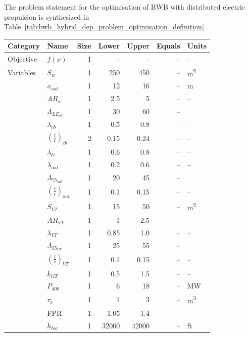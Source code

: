 The problem statement for the optimisation of BWB with distributed electric propulsion is synthesized in Table~\ref{tab:bwb_hybrid_dep_problem_optimisation_definition}. 
\begin{table}[h!]
	\centering
	\begin{tabular}{l l r r r r l}
		\hline
		\textbf{Category} & \textbf{Name} & \textbf{Size} & \textbf{Lower} & \textbf{Upper} & \textbf{Equals} & \textbf{Units} \\
		\hline
		Objective & $f\left(\underline{x}\right)$ & 1 & -- & -- & -- & -- \\
		\hline
		Variables & $S_w$ & 1 & \num{250} & \num{450} & -- & \si{\square\meter} \\
		& $x_{out}$ & 1 & \num{12} & \num{16} & -- & \si{\meter} \\
		& $AR_{w}$ & 1 & \num{2.5} & \num{5} & -- & -- \\
		& $\Lambda_{LE_{cb}}$ & 1 & \num{30} & \num{60} & -- & \si{\deg} \\
		& $\lambda_{cb}$ & 1 & \num{0.5} & \num{0.8} & -- & -- \\
		& $\left(\frac{t}{c}\right)_{cb}$ & 2 & \num{0.15} & \num{0.24} & -- & -- \\
		& $\lambda_{tr}$ & 1 & 0.6 & 0.8 & -- & -- \\
		& $\lambda_{out}$ & 1 & \num{0.2} & \num{0.6} & -- & -- \\
		& $\Lambda_{25_{out}}$ & 1 & \num{20} & \num{45} & -- & \si{\deg} \\
		& $\left(\frac{t}{c}\right)_{out}$ & 1 & \num{0.1} & \num{0.15} & -- & -- \\
		& $S_{VT}$ & 1 & \num{15} & \num{50} & -- & \si{\square\meter} \\
		& $AR_{VT}$ & 1 & \num{1} & \num{2.5} & -- & -- \\
		& $\lambda_{VT}$ & 1 & \num{0.85} & \num{1.0} & -- & -- \\
		& $\Lambda_{25_{VT}}$ & 1 & \num{25} & \num{55} & -- & \si{\deg} \\
		& $\left(\frac{t}{c}\right)_{VT}$ & 1 & \num{0.1} & \num{0.15} & -- & -- \\
		& $k_{GT}$ & 1 & \num{0.5} & \num{1.5} & -- & -- \\
		& $P_{400}$ & 1 & \num{6} & \num{18} & -- & \si{\mega\watt} \\
		& $\tau_{b}$ & 1 & \num{1} & \num{3} & -- & \si{\cubic\meter} \\
		& FPR & 1 & \num{1.05} & \num{1.4} & -- & -- \\
		& $h_{toc}$ & 1 & \num{32000} & \num{42000} & -- & ft \\

\end{tabular}
\end{table}
